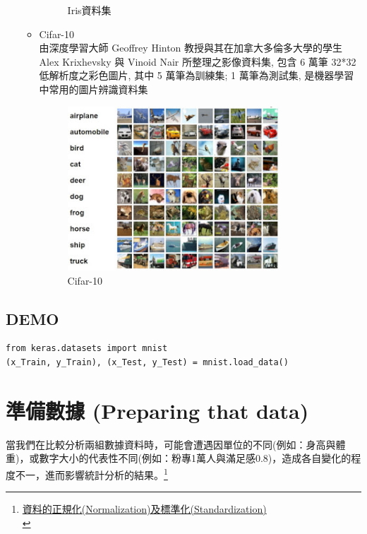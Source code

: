 \documentclass[a4paper,12pt]{article}
\begin{document}
\begin{enumerate}
\begin{itemize}
\begin{figure}[htbp]
\caption{\label{fig:Iris}Iris資料集}
\end{figure}
\item Cifar-10\\
由深度學習大師 Geoffrey Hinton 教授與其在加拿大多倫多大學的學生 Alex Krixhevsky 與 Vinoid Nair 所整理之影像資料集, 包含 6 萬筆 32*32 低解析度之彩色圖片, 其中 5 萬筆為訓練集; 1 萬筆為測試集, 是機器學習中常用的圖片辨識資料集\\
\begin{figure}[htbp]
\centering
\includegraphics[width=300]{images/cifar10-ten-categories.jpg}
\caption{\label{fig:Cifar10}Cifar-10}
\end{figure}
\end{itemize}
\end{enumerate}

\subsection{DEMO}
\label{sec:orgb72336b}
\lstset{breaklines=true,language=Python,label= ,caption= ,captionpos=b,numbers=none}
\begin{lstlisting}
from keras.datasets import mnist
(x_Train, y_Train), (x_Test, y_Test) = mnist.load_data()
\end{lstlisting}
\newpage

\section{準備數據 (Preparing that data)}
\label{sec:orgefb7a24}
當我們在比較分析兩組數據資料時，可能會遭遇因單位的不同(例如：身高與體重)，或數字大小的代表性不同(例如：粉專1萬人與滿足感0.8)，造成各自變化的程度不一，進而影響統計分析的結果。\footnote{\href{https://aifreeblog.herokuapp.com/posts/54/data\_science\_203/}{資料的正規化(Normalization)及標準化(Standardization)}\\}\\
\end{document}
